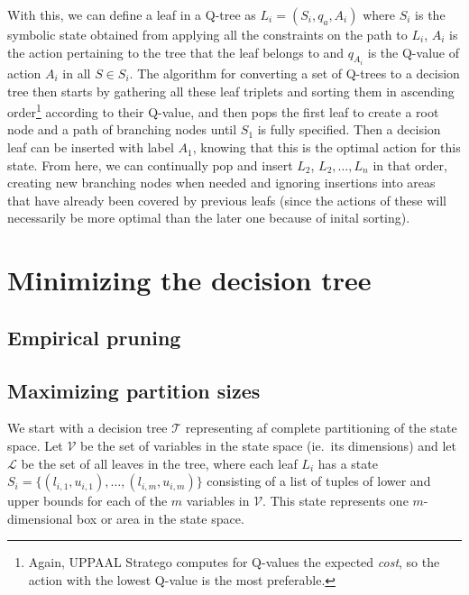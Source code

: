 \documentclass{article}
\begin{document}
With this, we can define a leaf in a Q-tree as $L_i = (S_i, q_a, A_i)$ where
$S_i$ is the symbolic state obtained from applying all the constraints on the
path to $L_i$, $A_i$ is the action pertaining to the tree that the leaf belongs
to and $q_{A_i}$ is the Q-value of action $A_i$ in all $S \in S_i$. The
algorithm for converting a set of Q-trees to a decision tree then starts by
gathering all these leaf triplets and sorting them in ascending order\footnote{%
    Again, UPPAAL Stratego computes for Q-values the expected \textit{cost}, so
the action with the lowest Q-value is the most preferable.} according to their
Q-value, and then pops the first leaf to create a root node and a path of
branching nodes until $S_1$ is fully specified. Then a decision leaf can be
inserted with label $A_1$, knowing that this is the optimal action for this
state. From here, we can continually pop and insert $L_2$, $L_2, \ldots, L_n$ in
that order, creating new branching nodes when needed and ignoring insertions
into areas that have already been covered by previous leafs (since the actions
of these will necessarily be more optimal than the later one because of inital
sorting).


\section{Minimizing the decision tree}%
\label{sec:minimizingDT}

\lipsum[1]

\subsection{Empirical pruning}%
\label{subsec:empPruning}

\lipsum[2]

\subsection{Maximizing partition sizes}%
\label{subsec:findBoxes}

We start with a decision tree $\mathcal{T}$ representing af complete
partitioning of the state space. Let $\mathcal{V}$ be the set of variables in
the state space (ie.\ its dimensions) and let $\mathcal{L}$ be the set of all
leaves in the tree, where each leaf $L_{i}$ has a state $S_i =
\{(l_{i,1},u_{i,1}), \ldots, (l_{i,m},u_{i,m})\}$ consisting of a list of tuples
of lower and upper bounds for each of the $m$ variables in $\mathcal{V}$. This
state represents one $m$-dimensional box or area in the state space.
\end{document}
